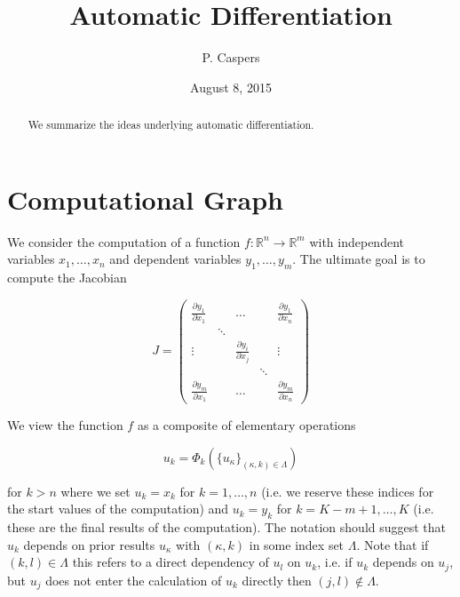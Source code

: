 \documentclass{amsart}
\theoremstyle{plain}
\numberwithin{equation}{section}
\begin{document}
\title[AD]{Automatic Differentiation}
\author{P. Caspers}
\date{August 8, 2015}
\begin{abstract}
We summarize the ideas underlying automatic differentiation.
\end{abstract}

\maketitle

\tableofcontents

\section{Computational Graph}

We consider the computation of a function $f: \mathbb{R}^n \rightarrow \mathbb{R}^m$ with independent variables $x_1, \dots , x_n$ and dependent variables $y_1, \dots , y_m$. The ultimate goal is to compute the Jacobian

\begin{equation}
J = \begin{pmatrix}
\frac{\partial y_1}{\partial x_1} &  & \dots &  & \frac{\partial y_1}{\partial x_n} \\
 & \ddots & & & \\
\vdots &  & \frac{\partial y_i}{\partial x_j} &  & \vdots \\
 &  &                                   & \ddots & \\
\frac{\partial y_m}{\partial x_1} & & \dots & & \frac{\partial y_m}{\partial x_n}
\end{pmatrix}
\end{equation}

We view the function $f$ as a composite of elementary operations

\begin{equation}
u_k = \Phi_k( \{u_\kappa\}_{(\kappa,k) \in \Lambda})
\end{equation}

for $k > n$ where we set $u_k = x_k$ for $k=1,\dots,n$ (i.e. we reserve these indices for the start values of the computation) and $u_k = y_k$ for $k=K-m+1, \dots, K$ (i.e. these are the final results of the computation). The notation should suggest that $u_k$ depends on prior results $u_\kappa$ with $(\kappa,k)$ in some index set $\Lambda$. Note that if $(k,l)\in\Lambda$ this refers to a direct dependency of $u_l$ on $u_k$, i.e. if $u_k$ depends on $u_j$, but $u_j$ does not enter the calculation of $u_k$ directly then $(j,l) \notin \Lambda$.
\end{document}
